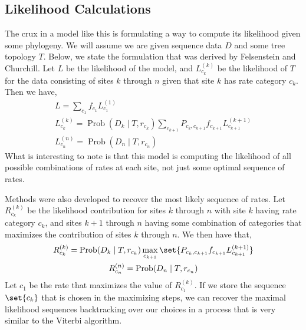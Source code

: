 \documentclass[12pt]{article}
\newcommand{\prob}{\operatorname{Prob}}
\begin{document}
\subsection*{Likelihood Calculations}
    The crux in a model like this is formulating a way to compute its likelihood given some phylogeny.
    We will assume we are given sequence data $D$ and some tree topology $T$.
    Below, we state the formulation that was derived by Felsenstein and Churchill.
    Let $L$ be the likelihood of the model, 
    and $L_{c_k}^{(k)}$ be the likelihood of $T$ for the data consisting of sites $k$ through $n$
    given that site $k$ has rate category $c_k$.
    Then we have,
    \begin{gather*}
        L = \sum_{c_1}f_{c_1}L_{c_1}^{(1)} \\
        L_{c_k}^{(k)} = 
            \prob(D_k \mid T, r_{c_k})
            \sum_{c_{k+1}}P_{c_k, c_{k+1}}f_{c_{k+1}}L_{c_{k+1}}^{(k+1)} \\
        L_{c_n}^{(n)} = 
            \prob(D_n \mid T, r_{c_n})
    \end{gather*}
    What is interesting to note is that this model is computing the likelihood of all possible combinations of rates at each site, not just some optimal sequence of rates.

    Methods were also developed to recover the most likely sequence of rates.
    Let $R_{c_k}^{(k)}$ be the likelihood contribution for sites $k$ through $n$ 
    with site $k$ having rate category $c_k$, 
    and sites $k+1$ through $n$ having some combination of categories that maximizes the contribution of sites $k$ through $n$.
    We then have that,
    \begin{gather*}
        R_{c_k}^{(k)} = 
            \prob(D_k \mid T, r_{c_k})
            \max_{c_{k+1}}\set{P_{c_k, c_{k+1}}f_{c_{k+1}}L_{c_{k+1}}^{(k+1)}} \\
        R_{c_n}^{(n)} = 
            \prob(D_n \mid T, r_{c_n})
    \end{gather*}
    Let $c_1$ be the rate that maximizes the value of $R_{c_1}^{(k)}$.
    If we store the sequence $\set{c_k}$ that is chosen in the maximizing steps, 
    we can recover the maximal likelihood sequences backtracking over our choices
    in a process that is very similar to the Viterbi algorithm.
\end{document}
